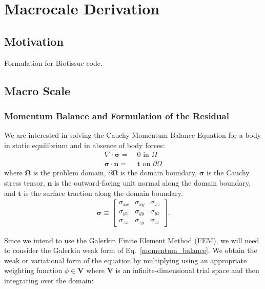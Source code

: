 \chapter{Macrocale Derivation}

\section{Motivation}

Formulation for Biotissue code.

\section{Macro Scale}

\subsection{Momentum Balance and Formulation of the Residual}

We are interested in solving the Cauchy Momentum Balance Equation for a body in static equilibrium and in absence of body forces:
%
\begin{align}
\nabla \cdot \pmb{\sigma} =& \; 0 \text{ in } \Omega \label{momentum_balance} \\
\pmb{\sigma} \cdot \pmb{n} =& \; \pmb{t} \text{ on } \partial \Omega \nonumber
\end{align}
%
where $\pmb{\Omega}$ is the problem domain, $\partial \pmb{\Omega}$ is the domain boundary, $\pmb{\sigma}$ is the Cauchy stress tensor, $\pmb{n}$ is the outward-facing unit normal along the domain boundary, and $\pmb{t}$ is the surface traction along the domain boundary.
%
\begin{eqnarray}
\pmb{\sigma} \equiv
\begin{bmatrix}
\sigma_{xx} & \sigma_{xy} & \sigma_{xz} \\
\sigma_{yx} & \sigma_{yy} & \sigma_{yz} \\
\sigma_{zx} & \sigma_{zy} & \sigma_{zz} 
\end{bmatrix} .
\label{cauchy_stress_tensor}
\end{eqnarray}
%

Since we intend to use the Galerkin Finite Element Method (FEM), we will need to consider the Galerkin weak form of Eq.\ \eqref{momentum_balance}. We obtain the weak or variational form of the equation by multiplying using an appropriate weighting function $\phi \in \pmb{V}$ where $\pmb{V}$ is an infinite-dimensional trial space and then integrating over the domain:

